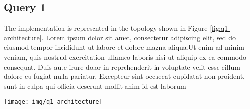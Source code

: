 \subsection{Query 1}
The implementation is represented in the topology shown in Figure \ref{fig:q1-architecture}.
Lorem ipsum dolor sit amet, consectetur adipiscing elit, sed do eiusmod tempor incididunt ut labore et dolore magna aliqua.Ut enim ad minim veniam, quis nostrud exercitation ullamco laboris nisi ut aliquip ex ea commodo consequat. Duis aute irure dolor in reprehenderit in voluptate velit esse cillum dolore eu fugiat nulla pariatur. Excepteur sint occaecat cupidatat non proident, sunt in culpa qui officia deserunt mollit anim id est laborum.

\begin{figure*}[t]
	\centering
	\texttt{[image: img/q1-architecture]}
	\caption{Query 1: the topology of operators.}
	\label{fig:q1-architecture}
\end{figure*}